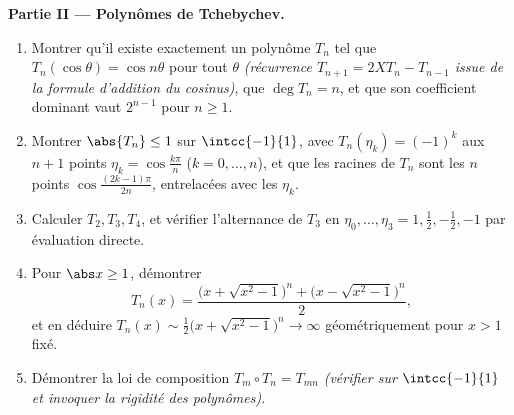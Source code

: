 \begin{problem}
\medskip
\noindent\textbf{Partie II --- Polynômes de Tchebychev.}
\begin{enumerate}[resume]
  \item Montrer qu'il existe exactement un polynôme $T_n$ tel que
        $T_n(\cos\theta) = \cos n\theta$ pour tout $\theta$
        \emph{(récurrence $T_{n+1} = 2XT_n - T_{n-1}$ issue de la
        formule d'addition du cosinus)}, que $\deg T_n = n$, et que
        son coefficient dominant vaut $2^{n-1}$ pour $n \geq 1$.
  \item Montrer $\abs{T_n} \leq 1$ sur $\intcc{-1}{1}$, avec
        $T_n(\eta_k) = (-1)^k$ aux $n + 1$ points $\eta_k =
        \cos\frac{k\pi}{n}$ ($k = 0, \dots, n$), et que les
        racines de $T_n$ sont les $n$ points
        $\cos\frac{(2k-1)\pi}{2n}$, entrelacées avec les $\eta_k$.
  \item Calculer $T_2, T_3, T_4$, et vérifier l'alternance de
        $T_3$ en $\eta_0, \dots, \eta_3 = 1, \frac12, -\frac12,
        -1$ par évaluation directe.
  \item Pour $\abs x \geq 1$, démontrer
        \[
        T_n(x) = \frac{\bigl(x + \sqrt{x^2 - 1}\bigr)^n +
        \bigl(x - \sqrt{x^2 - 1}\bigr)^n}{2},
        \]
        et en déduire $T_n(x) \sim \frac12\bigl(x + \sqrt{x^2 -
        1}\bigr)^n \to \infty$ géométriquement pour $x > 1$ fixé.
  \item Démontrer la loi de composition $T_m \circ T_n = T_{mn}$
        \emph{(vérifier sur $\intcc{-1}{1}$ et invoquer la rigidité
        des polynômes)}.
\end{enumerate}


\end{problem}
